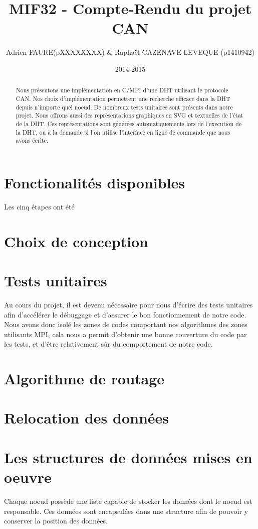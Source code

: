\documentclass[a4paper, 11pt, french]{article}
\title{\textbf{MIF32 - Compte-Rendu du projet CAN}}
\author{Adrien FAURE(pXXXXXXXX) \& Raphaël CAZENAVE-LEVEQUE (p1410942)}
\date{2014-2015}
\begin{document}
    \maketitle

\begin{abstract}
Nous présentons une implémentation en C/MPI d'une DHT utilisant le protocole CAN. Nos choix d'implémentation permettent une recherche efficace dans la DHT depuis n'importe quel noeud. De nombreux tests unitaires sont présents dans notre projet. Nous offrons aussi des représentations graphiques en SVG et textuelles de l'état de la DHT. Ces représentations sont générées automatiquements lors de l'execution de la DHT, ou à la demande si l'on utilise l'interface en ligne de commande que nous avons écrite.
\end{abstract}
\section{Fonctionalités disponibles}
Les cinq étapes ont été
\section{Choix de conception}
\section{Tests unitaires}
Au cours du projet, il est devenu nécessaire pour nous d'écrire des tests unitaires afin d'accélérer le débuggage et d'assurer le bon fonctionnement de notre code. Nous avons donc isolé les zones de codes comportant nos algorithmes des zones utilisants MPI, cela nous a permit d'obtenir une bonne couverture du code par les tests, et d'être relativement sûr du comportement de notre code.
\section{Algorithme de routage}
\section{Relocation des données}
\section {Les structures de données mises en oeuvre}
Chaque noeud possède une liste capable de stocker les données dont le noeud est responsable. Ces données sont encapsulées dans une structure afin de pouvoir y conserver la position des données.
\end{document}
